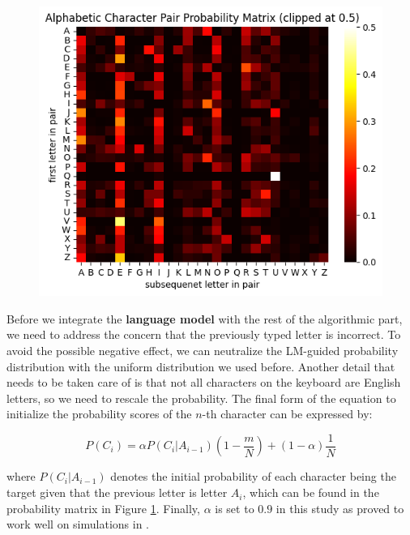 \documentclass{article}
\begin{document}
\vspace{-3mm}
\begin{figure}[H]
	\centering
	\includegraphics[width=0.5\linewidth]{2gram.png}
	\label{fig:4}
\end{figure}

\vspace{-3mm}
Before we integrate the \textbf{language model} with the rest of the algorithmic part, we need to address the concern that the previously typed letter is incorrect. To avoid the possible negative effect, we can neutralize the LM-guided probability distribution with the uniform distribution we used before. Another detail that needs to be taken care of is that not all characters on the keyboard are English letters, so we need to rescale the probability. The final form of the equation to initialize the probability scores of the $n$-th character can be expressed by:

\begin{equation}
	P(C_i) = \alpha P(C_i|A_{i-1})(1 - \frac{m}{N}) + (1-\alpha)\frac{1}{N}
\end{equation}

where $P(C_i|A_{i-1})$ denotes the initial probability of each character being the target given that the previous letter is letter $A_i$, which can be found in the probability matrix in Figure \ref{fig:4}. Finally, $\alpha$ is set to $0.9$ in this study as proved to work well on simulations in \cite{mainsah2014utilizing}.
\end{document}
